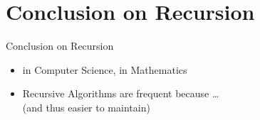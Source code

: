 \section{Conclusion on Recursion}
\begin{frame}{Conclusion on Recursion}
  \medskip


  \begin{itemize}
  \item {} in Computer Science,  in
    Mathematics\\ 
    \medskip
  \item Recursive Algorithms are frequent because  \ldots \\
    {\small (and thus easier to maintain)}


\end{itemize}
\end{frame}
